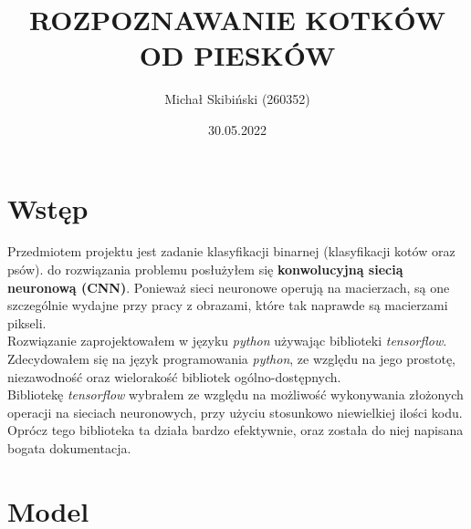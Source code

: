 \documentclass[a4paper,12pt]{scrartcl}
\title{ROZPOZNAWANIE KOTKÓW OD PIESKÓW}
\author{Michał Skibiński (260352)}
\date{30.05.2022}
\begin{document}
\maketitle

\section{Wstęp}
Przedmiotem projektu jest zadanie klasyfikacji binarnej (klasyfikacji kotów oraz psów).
do rozwiązania problemu posłużyłem się \textbf{konwolucyjną siecią neuronową (CNN)}.
Ponieważ sieci neuronowe operują na macierzach, są one szczególnie wydajne przy pracy z obrazami, 
które tak naprawde są macierzami pikseli. \\
Rozwiązanie zaprojektowałem  w języku \textit{python} używając biblioteki \textit{tensorflow}.\\
Zdecydowałem się na język programowania \textit{python}, ze względu na jego prostotę, 
niezawodność oraz wielorakość bibliotek ogólno-dostępnych. \\
Bibliotekę \textit{tensorflow} wybrałem ze względu na możliwość 
wykonywania złożonych operacji na sieciach neuronowych, przy użyciu stosunkowo
niewielkiej ilości kodu. Oprócz tego biblioteka ta działa bardzo efektywnie,
 oraz została do niej napisana bogata dokumentacja.\\

\newpage{}
\section{Model}
\end{document}
